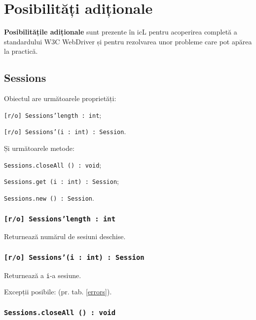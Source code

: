 

\section{Posibilități adiționale}

{\bf Posibilitățile adiționale} sunt prezente în icL pentru acoperirea completă a standardului W3C WebDriver și pentru rezolvarea unor probleme care pot apărea la practică.

\subsection{{\color{orange} Sessions}}

Obiectul \sessions{} are următoarele proprietăți:
\begin{icItems}
	\item \texttt{[r/o] Sessions'length : int};
	\item \texttt{[r/o] Sessions'(i : int) : Session}.
\end{icItems}

Și următoarele metode:
\begin{icItems}
	\item \texttt{Sessions.closeAll () : void};
	\item \texttt{Sessions.get (i : int) : Session};
	\item \texttt{Sessions.new () : Session}.
\end{icItems}

\subsubsection{\texttt{[r/o] Sessions'length : int}}

Returnează numărul de sesiuni deschise.

\subsubsection{\texttt{[r/o] Sessions'(i : int) : Session}}

Returnează a \texttt{i}-a sesiune.

Excepții posibile:  (pr. tab. \ref{errors}).

\subsubsection{\texttt{Sessions.closeAll () : void}}

